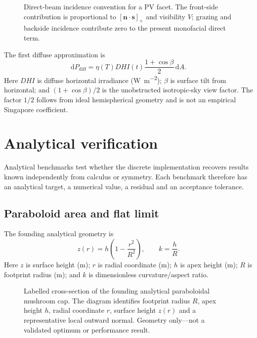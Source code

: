 \documentclass[11pt,a4paper]{article}
\begin{document}
\begin{figure}[htbp]
\centering

\caption{Direct-beam incidence convention for a PV facet. The front-side contribution is proportional to $[\mathbf n\!\cdot\!\mathbf s]_+$ and visibility $V$; grazing and backside incidence contribute zero to the present monofacial direct term.}
\label{fig:direct-incidence}
\end{figure}

The first diffuse approximation is
\begin{equation}
\mathrm dP_{\mathrm{diff}}=\eta(T)DHI(t)\frac{1+\cos\beta}{2}\,\mathrm dA.
\label{eq:diffuse}
\end{equation}
Here $DHI$ is diffuse horizontal irradiance (\si{\watt\per\square\metre}); $\beta$ is surface tilt from horizontal; and $(1+\cos\beta)/2$ is the unobstructed isotropic-sky view factor. The factor $1/2$ follows from ideal hemispherical geometry and is not an empirical Singapore coefficient.

\section{Analytical verification}
Analytical benchmarks test whether the discrete implementation recovers results known independently from calculus or symmetry. Each benchmark therefore has an analytical target, a numerical value, a residual and an acceptance tolerance.
\subsection{Paraboloid area and flat limit}
The founding analytical geometry is
\begin{equation}
z(r)=h\left(1-\frac{r^2}{R^2}\right),\qquad k=\frac{h}{R}.
\label{eq:surface}
\end{equation}
Here $z$ is surface height (m); $r$ is radial coordinate (m); $h$ is apex height (m); $R$ is footprint radius (m); and $k$ is dimensionless curvature/aspect ratio.

\begin{figure}[htbp]
\centering

\caption{Labelled cross-section of the founding analytical paraboloidal mushroom cap. The diagram identifies footprint radius $R$, apex height $h$, radial coordinate $r$, surface height $z(r)$ and a representative local outward normal. Geometry only---not a validated optimum or performance result.}
\label{fig:mushroom-geometry}
\end{figure}
\end{document}
